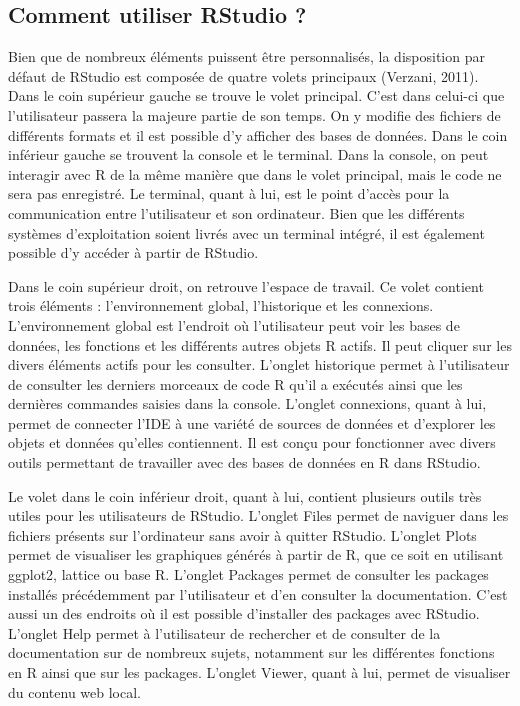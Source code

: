 \documentclass[
  letterpaper,
  DIV=11,
  numbers=noendperiod]{scrreprt}
\begin{document}
\subsection{Comment utiliser RStudio ?}\label{comment-utiliser-rstudio}

Bien que de nombreux éléments puissent être personnalisés, la
disposition par défaut de RStudio est composée de quatre volets
principaux (Verzani, 2011). Dans le coin supérieur gauche se trouve le
volet principal. C'est dans celui-ci que l'utilisateur passera la
majeure partie de son temps. On y modifie des fichiers de différents
formats et il est possible d'y afficher des bases de données. Dans le
coin inférieur gauche se trouvent la console et le terminal. Dans la
console, on peut interagir avec R de la même manière que dans le volet
principal, mais le code ne sera pas enregistré. Le terminal, quant à
lui, est le point d'accès pour la communication entre l'utilisateur et
son ordinateur. Bien que les différents systèmes d'exploitation soient
livrés avec un terminal intégré, il est également possible d'y accéder à
partir de RStudio.

Dans le coin supérieur droit, on retrouve l'espace de travail. Ce volet
contient trois éléments : l'environnement global, l'historique et les
connexions. L'environnement global est l'endroit où l'utilisateur peut
voir les bases de données, les fonctions et les différents autres objets
R actifs. Il peut cliquer sur les divers éléments actifs pour les
consulter. L'onglet historique permet à l'utilisateur de consulter les
derniers morceaux de code R qu'il a exécutés ainsi que les dernières
commandes saisies dans la console. L'onglet connexions, quant à lui,
permet de connecter l'IDE à une variété de sources de données et
d'explorer les objets et données qu'elles contiennent. Il est conçu pour
fonctionner avec divers outils permettant de travailler avec des bases
de données en R dans RStudio.

Le volet dans le coin inférieur droit, quant à lui, contient plusieurs
outils très utiles pour les utilisateurs de RStudio. L'onglet Files
permet de naviguer dans les fichiers présents sur l'ordinateur sans
avoir à quitter RStudio. L'onglet Plots permet de visualiser les
graphiques générés à partir de R, que ce soit en utilisant ggplot2,
lattice ou base R. L'onglet Packages permet de consulter les packages
installés précédemment par l'utilisateur et d'en consulter la
documentation. C'est aussi un des endroits où il est possible
d'installer des packages avec RStudio. L'onglet Help permet à
l'utilisateur de rechercher et de consulter de la documentation sur de
nombreux sujets, notamment sur les différentes fonctions en R ainsi que
sur les packages. L'onglet Viewer, quant à lui, permet de visualiser du
contenu web local.
\end{document}
